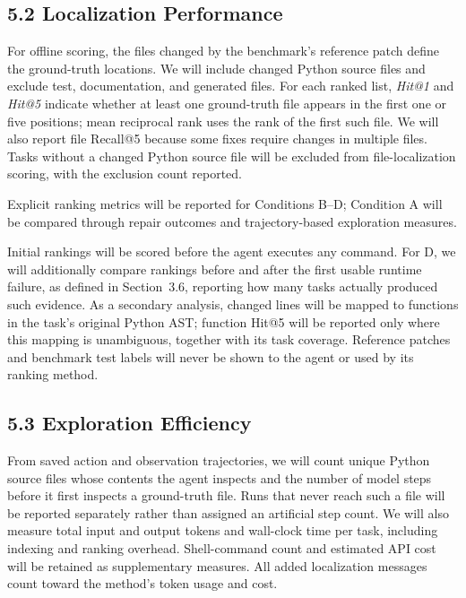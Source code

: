 \documentclass[11pt]{article}
\begin{document}
\subsection*{5.2 Localization Performance}

For offline scoring, the files changed by the benchmark's reference
patch define the ground-truth locations. We will include changed Python
source files and exclude test, documentation, and generated files. For
each ranked list, \emph{Hit@1} and \emph{Hit@5} indicate whether at
least one ground-truth file appears in the first one or five positions;
mean reciprocal rank uses the rank of the first such file. We will also
report file Recall@5 because some fixes require changes in multiple
files. Tasks without a changed Python source file will be excluded from
file-localization scoring, with the exclusion count reported.

Explicit ranking metrics will be reported for Conditions B--D;
Condition A will be compared through repair outcomes and
trajectory-based exploration measures.

Initial rankings will be scored before the agent executes any command.
For D, we will additionally compare rankings before and after the first usable runtime failure, as defined in Section~3.6, reporting how many tasks actually produced such
evidence. As a secondary analysis, changed lines will be mapped to
functions in the task's original Python AST; function Hit@5 will be
reported only where this mapping is unambiguous, together with its task
coverage. Reference patches and benchmark test labels will never be
shown to the agent or used by its ranking method.


\subsection*{5.3 Exploration Efficiency}

From saved action and observation trajectories, we will count unique
Python source files whose contents the agent inspects and the number of
model steps before it first inspects a ground-truth file. Runs that
never reach such a file will be reported separately rather than assigned
an artificial step count. We will also measure total input and output
tokens and wall-clock time per task, including indexing and ranking
overhead. Shell-command count and estimated API cost will be retained
as supplementary measures. All added localization messages count toward
the method's token usage and cost.
\end{document}
